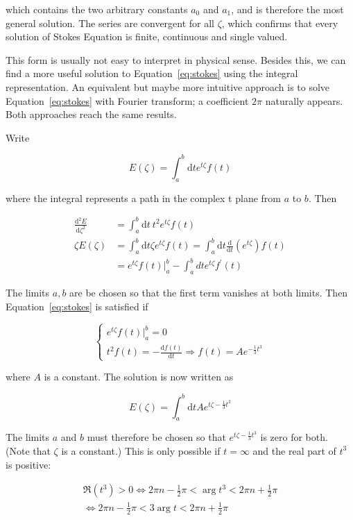 \documentclass[
  notoc %
]{tufte-book}
\begin{document}
which contains the two arbitrary constants \(a_0\) and \(a_1\), and is
therefore the most general solution. The series are convergent for all
\(\zeta\), which confirms that every solution of Stokes Equation is
finite, continuous and single valued.

This form is usually not easy to interpret in physical sense. Besides
this, we can find a more useful solution to Equation~\ref{eq:stokes}
using the integral representation. An equivalent but maybe more
intuitive approach is to solve Equation~\ref{eq:stokes} with Fourier
transform; a coefficient \(2\pi\) naturally appears. Both approaches
reach the same results.

Write

\[
E(\zeta) = \int_a^b \mathrm{d}t e^{t\zeta} f(t)
\]

where the integral represents a path in the complex t plane from \(a\)
to \(b\). Then

\[
\begin{aligned}
\frac{\mathrm{d}^2 E}{\mathrm{d}\zeta^2} &= \int_a^b \mathrm{d}t\ t^2 e^{t\zeta} f(t) \\
\zeta E(\zeta) &= \int_a^b \mathrm{d}t \zeta e^{t\zeta} f(t) = \int_a^b \mathrm{d}t \frac{\mathrm{d}}{\mathrm{d}t}(e^{t\zeta}) f(t) \\
&=e^{t\zeta} f(t) \Big|_a^b -\int_a^b dte^{t\zeta} f^\prime(t)
\end{aligned}
\]

The limits \(a,b\) are be chosen so that the first term vanishes at both
limits. Then Equation~\ref{eq:stokes} is satisfied if

\[
\left\{
\begin{array}{l}
e^{t\zeta} f(t) \Big|_a^b  = 0\\
t^2 f(t) = -\frac{\mathrm{d} f(t)}{\mathrm{d}t} \Rightarrow f(t) = Ae^{-\frac{1}{3}t^3}
\end{array} \right.
\]

where \(A\) is a constant. The solution is now written as

\[
E(\zeta) = \int_a^b \mathrm{d}t Ae^{t\zeta-\frac{1}{3}t^3}
\]

The limits \(a\) and \(b\) must therefore be chosen so that
\(e^{t\zeta-\frac{1}{3}t^3}\) is zero for both. (Note that \(\zeta\) is
a constant.) This is only possible if \(t=\infty\) and the real part of
\(t^3\) is positive:

\[
\begin{aligned}
\Re(t^3) > 0 \Leftrightarrow 2\pi n -\frac{1}{2}\pi < \arg{t^3} < 2\pi n + \frac{1}{2}\pi \\
\Leftrightarrow 2\pi n -\frac{1}{2}\pi < 3 \arg{t} < 2\pi n + \frac{1}{2}\pi
\end{aligned}
\]
\end{document}
